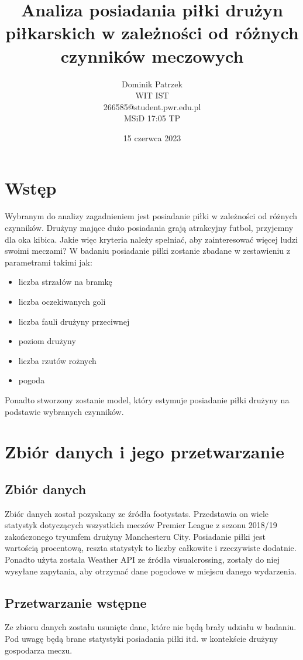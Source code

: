 \documentclass[11pt]{article}
\title{{\Huge Analiza posiadania piłki drużyn piłkarskich w zależności od różnych czynników meczowych}}
\author{Dominik Patrzek\\
WIT IST\\
266585@student.pwr.edu.pl\\
 MSiD 17:05 TP}
\date{15 czerwca 2023}
\begin{document}
\maketitle

\section{Wstęp}
Wybranym do analizy zagadnieniem jest posiadanie piłki w zależności od różnych czynników. Drużyny mające dużo posiadania grają atrakcyjny futbol, przyjemny dla oka kibica. Jakie więc kryteria należy spełniać, aby zainteresować więcej ludzi swoimi meczami? W badaniu posiadanie piłki zostanie zbadane w zestawieniu z parametrami takimi jak:
\begin{itemize}[itemsep=1pt, topsep=1pt]
  \item liczba strzałów na bramkę
  \item liczba oczekiwanych goli
  \item liczba fauli drużyny przeciwnej
  \item poziom drużyny
  \item liczba rzutów rożnych
  \item pogoda
  \newline
\end{itemize}
Ponadto stworzony zostanie model, który estymuje posiadanie piłki drużyny na podstawie wybranych czynników.

\section{Zbiór danych i jego przetwarzanie}
\subsection{Zbiór danych}

Zbiór danych został pozyskany ze źródła footystats\cite{footystats}. Przedstawia on wiele statystyk dotyczących wszystkich meczów Premier League z sezonu 2018/19 zakończonego tryumfem drużyny Manchesteru City. Posiadanie piłki jest wartością procentową, reszta statystyk to liczby całkowite i rzeczywiste dodatnie. Ponadto użyta została Weather API ze źródła visualcrossing\cite{weather}, zostały do niej wysyłane zapytania, aby otrzymać dane pogodowe w miejscu danego wydarzenia.


\subsection{Przetwarzanie wstępne}
Ze zbioru danych zostału usunięte dane, które nie będą brały udziału w badaniu. Pod uwagę będą brane statystyki posiadania piłki itd. w kontekście drużyny gospodarza meczu.
\end{document}
